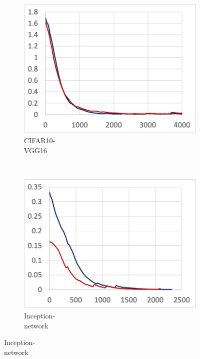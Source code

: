\begin{figure}[!ht]
\begin{subfigure}[t]{.22\textwidth}
    \includegraphics[width=\textwidth]{tf2-06}
    \caption{\small CIFAR10-\\VGG16}
  \end{subfigure}
  ~
  \begin{subfigure}[t]{.22\textwidth}
    \includegraphics[width=\textwidth]{tf2-07}
    \caption{\small Inception-\\network}
  \end{subfigure}
  

  \par\bigskip


\end{figure}
